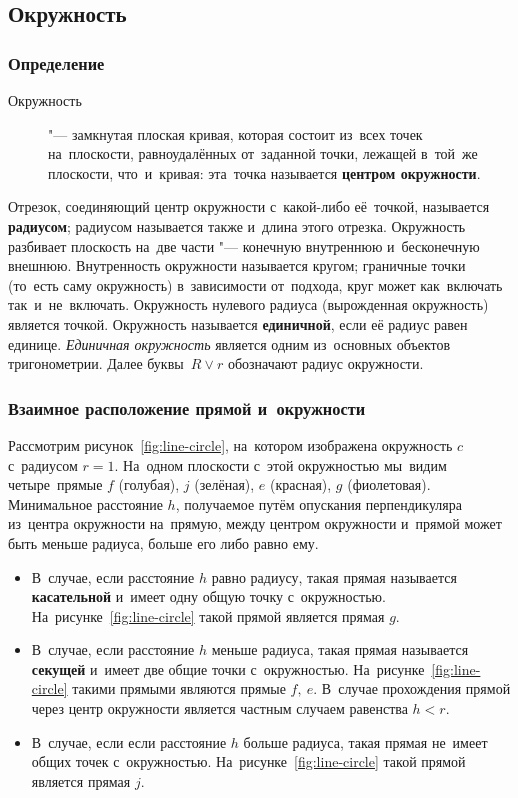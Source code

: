 \documentclass[]{scrartcl}
\begin{document}
\subsection{Окружность}
\subsubsection{Определение}
\begin{description}
	\item[Окружность] "--- замкнутая плоская кривая, которая состоит из~всех точек на~плоскости, равноудалённых от~заданной точки, лежащей в~той~же плоскости, что~и~кривая: эта~точка называется \textbf{центром окружности}.
\end{description}
Отрезок, соединяющий центр окружности с~какой-либо её~точкой, называется \textbf{радиусом}; радиусом называется также и~длина этого отрезка. Окружность разбивает плоскость на~две части "--- конечную внутреннюю и~бесконечную внешнюю. Внутренность окружности называется кругом; граничные точки (то~есть саму окружность) в~зависимости от~подхода, круг может как~включать так~и~не~включать. Окружность нулевого радиуса (вырожденная окружность) является точкой. Окружность называется \textbf{единичной}, если её радиус равен единице. \emph{Единичная окружность} является одним из~основных объектов тригонометрии. Далее буквы~${\textstyle R \vee r}$ обозначают радиус окружности. 

\subsubsection{Взаимное расположение прямой и~окружности}
Рассмотрим рисунок~\ref{fig:line-circle}, на~котором изображена окружность ${\textstyle c}$ с~радиусом ${\textstyle r=1}$. На~одном плоскости с~этой окружностью мы~видим четыре~прямые ${\textstyle f}$ (голубая), ${\textstyle j}$ (зелёная), ${\textstyle e}$ (красная), ${\textstyle g}$ (фиолетовая). Минимальное расстояние ${\textstyle h}$, получаемое путём опускания перпендикуляра из~центра окружности на~прямую, между центром окружности и~прямой может быть меньше радиуса, больше его либо равно ему. 
\begin{itemize}
	\item В~случае, если расстояние ${\textstyle h}$ равно радиусу, такая прямая называется \textbf{касательной} и~имеет одну общую точку с~окружностью. На~рисунке~\ref{fig:line-circle} такой прямой является прямая ${\textstyle g}$.
	\item В~случае, если расстояние ${\textstyle h}$ меньше радиуса, такая прямая называется \textbf{секущей} и~имеет две общие точки с~окружностью. На~рисунке~\ref{fig:line-circle} такими прямыми являются прямые ${\textstyle f,\ e}$. В~случае прохождения прямой через центр окружности является частным случаем равенства ${\textstyle h < r}$.
	\item В~случае, если если расстояние ${\textstyle h}$ больше радиуса, такая прямая не~имеет общих точек с~окружностью. На~рисунке~\ref{fig:line-circle} такой прямой является прямая ${\textstyle j}$.
\end{itemize}
\end{document}
